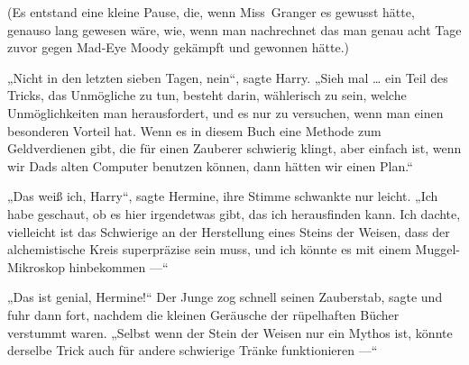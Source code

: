 (Es entstand eine kleine Pause, die, wenn Miss~Granger es gewusst hätte, genauso lang gewesen wäre, wie, wenn man nachrechnet das man genau acht Tage zuvor gegen Mad-Eye Moody gekämpft und gewonnen hätte.)

„Nicht in den letzten sieben Tagen, nein“, sagte Harry.
„Sieh mal … ein Teil des Tricks, das Unmögliche zu tun, besteht darin, wählerisch zu sein, welche Unmöglichkeiten man herausfordert, und es nur zu versuchen, wenn man einen besonderen Vorteil hat. Wenn es in diesem Buch eine Methode zum Geldverdienen gibt, die für einen Zauberer schwierig klingt, aber einfach ist, wenn wir Dads alten Computer benutzen können, dann hätten wir einen Plan.“

„Das weiß ich, Harry“, sagte Hermine, ihre Stimme schwankte nur leicht.
„Ich habe geschaut, ob es hier irgendetwas gibt, das ich herausfinden kann. Ich dachte, vielleicht ist das Schwierige an der Herstellung eines Steins der Weisen, dass der alchemistische Kreis superpräzise sein muss, und ich könnte es mit einem Muggel-Mikroskop hinbekommen —“

„Das ist genial, Hermine!“ Der Junge zog schnell seinen Zauberstab, sagte  und fuhr dann fort, nachdem die kleinen Geräusche der rüpelhaften Bücher verstummt waren.
„Selbst wenn der Stein der Weisen nur ein Mythos ist, könnte derselbe Trick auch für andere schwierige Tränke funktionieren —“

